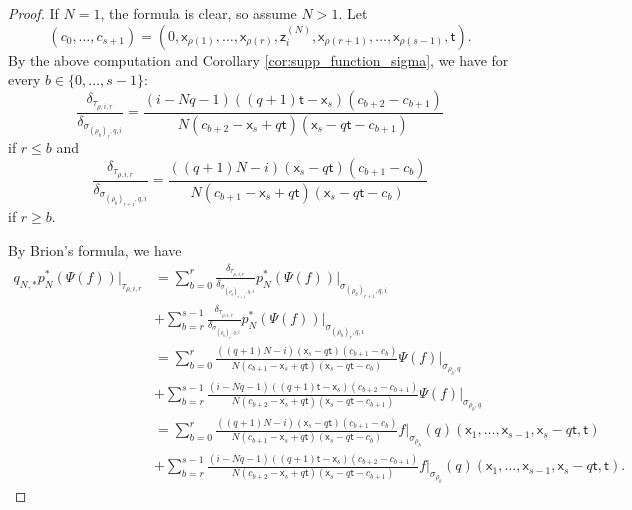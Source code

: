 \documentclass[11pt]{article}
\theoremstyle{definition}
\begin{document}
\begin{proof}
	If $N=1$, the formula is clear, so assume $N>1$.
	Let
	$$(c_0,\dots,c_{s+1})=(0,\mathsf{x}_{\rho(1)},\dots,\mathsf{x}_{\rho(r)},\mathsf{z}_i^{(N)},\mathsf{x}_{\rho(r+1)},\dots,\mathsf{x}_{\rho(s-1)},\mathsf{t}).$$
	By the above computation and Corollary \ref{cor:supp_function_sigma}, we have for every $b\in \{0,\dots,s-1\}$:
	$$\frac{\delta_{\tau_{\rho,i,r}}}{\delta_{\sigma_{(\rho_{b})_r,q,i}}}=\frac{(i-Nq-1)((q+1)\mathsf{t}-\mathsf{x}_s)(c_{b+2}-c_{b+1})}{N(c_{b+2}-\mathsf{x}_s+q\mathsf{t})(\mathsf{x}_s-q\mathsf{t}-c_{b+1})}$$
	if $r\le b$ and
	$$\frac{\delta_{\tau_{\rho,i,r}}}{\delta_{\sigma_{(\rho_{b})_{r+1},q,i}}}=\frac{((q+1)N-i)(\mathsf{x}_s-q\mathsf{t})(c_{b+1}-c_{b})}{N(c_{b+1}-\mathsf{x}_s+q\mathsf{t})(\mathsf{x}_s-q\mathsf{t}-c_{b})}$$
	if $r\ge b$.

	By Brion's formula, we have
    {\allowdisplaybreaks
	\begin{align*}
		q_{N,\ast}p_N^{\ast}(\Psi(f))|_{\tau_{\rho,i,r}}&=\sum_{b=0}^{r}\frac{\delta_{\tau_{\rho,i,r}}}{\delta_{\sigma_{(\rho_{b})_{r+1},q,i}}}p_N^{\ast}(\Psi(f))|_{\sigma_{(\rho_{b})_{r+1},q,i}}\\
														&+\sum_{b=r}^{s-1}\frac{\delta_{\tau_{\rho,i,r}}}{\delta_{\sigma_{(\rho_{b})_{r},q,i}}}p_N^{\ast}(\Psi(f))|_{\sigma_{(\rho_{b})_{r},q,i}}\\
														&=\sum_{b=0}^{r}\frac{((q+1)N-i)(\mathsf{x}_s-q\mathsf{t})(c_{b+1}-c_{b})}{N(c_{b+1}-\mathsf{x}_s+q\mathsf{t})(\mathsf{x}_s-q\mathsf{t}-c_{b})}\Psi(f)|_{\sigma_{\rho_{b},q}}\\
														&+\sum_{b=r}^{s-1}\frac{(i-Nq-1)((q+1)\mathsf{t}-\mathsf{x}_s)(c_{b+2}-c_{b+1})}{N(c_{b+2}-\mathsf{x}_s+q\mathsf{t})(\mathsf{x}_s-q\mathsf{t}-c_{b+1})}\Psi(f)|_{\sigma_{\rho_{b},q}}\\
														&=\sum_{b=0}^{r}\frac{((q+1)N-i)(\mathsf{x}_s-q\mathsf{t})(c_{b+1}-c_{b})}{N(c_{b+1}-\mathsf{x}_s+q\mathsf{t})(\mathsf{x}_s-q\mathsf{t}-c_{b})}f|_{\sigma_{\rho_b}}(q)(\mathsf{x}_1,\dots,\mathsf{x}_{s-1},\mathsf{x}_s-q\mathsf{t},\mathsf{t})\\
														&+\sum_{b=r}^{s-1}\frac{(i-Nq-1)((q+1)\mathsf{t}-\mathsf{x}_s)(c_{b+2}-c_{b+1})}{N(c_{b+2}-\mathsf{x}_s+q\mathsf{t})(\mathsf{x}_s-q\mathsf{t}-c_{b+1})}f|_{\sigma_{\rho_{b}}}(q)(\mathsf{x}_1,\dots,\mathsf{x}_{s-1},\mathsf{x}_s-q\mathsf{t},\mathsf{t}).
	\end{align*}}


\end{proof}
\end{document}
